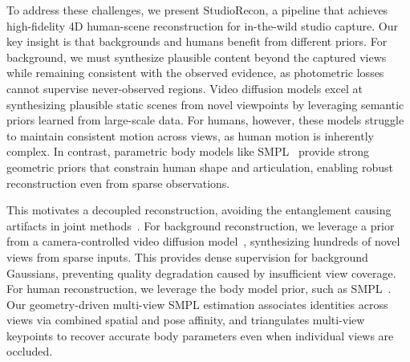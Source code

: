 \documentclass[acmtog]{acmart}
\newcommand{\ours}{StudioRecon}
\begin{document}
To address these challenges, we present \ours{}, a pipeline that achieves high-fidelity 4D human-scene reconstruction for in-the-wild studio capture.
Our key insight is that backgrounds and humans benefit from different priors.
For background, we must synthesize plausible content beyond the captured views while remaining consistent with the observed evidence, as photometric losses cannot supervise never-observed regions.
Video diffusion models excel at synthesizing plausible static scenes from novel viewpoints by leveraging semantic priors learned from large-scale data.
For humans, however, these models struggle to maintain consistent motion across views, as human motion is inherently complex.
In contrast, parametric body models like SMPL~\cite{loper2023smpl} provide strong geometric priors that constrain human shape and articulation, enabling robust reconstruction even from sparse observations.

This motivates a decoupled reconstruction, avoiding the entanglement causing artifacts in joint methods~\cite{wang2025shape, wang2025monofusion}.
For background reconstruction, we leverage a prior from a camera-controlled video diffusion model~\cite{ren2025gen3c}, synthesizing hundreds of novel views from sparse inputs.
This provides dense supervision for background Gaussians, preventing quality degradation caused by insufficient view coverage.
For human reconstruction, we leverage the body model prior, such as SMPL~\cite{loper2023smpl}.
Our geometry-driven multi-view SMPL estimation associates identities across views via combined spatial and pose affinity, and triangulates multi-view keypoints to recover accurate body parameters even when individual views are occluded.
\end{document}
